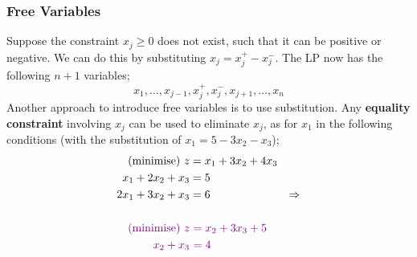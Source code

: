 \documentclass[a4paper, 12pt]{article}
\newcommand{\violet}[1]{\textcolor{violet}{#1}}
\begin{document}
            \subsubsection*{Free Variables}
                Suppose the constraint $x_j \geq 0$ does not exist, such that it can be positive or negative.
                We can do this by substituting $x_j = x_j^+ - x_j^-$.
                The LP now has the following $n + 1$ variables;
                $$x_1, \dots, x_{j - 1}, x_j^+, x_j^-, x_{j + 1}, \dots, x_n$$
                Another approach to introduce free variables is to use substitution.
                Any \textbf{equality constraint} involving $x_j$ can be used to eliminate $x_j$, as for $x_1$ in the following conditions (with the substitution of $x_1 = 5 - 3x_2 - x_3$);
                \begin{align*}
                    \text{(minimise) } z & = x_1 + 3x_2 + 4x_3 \\
                    x_1 + 2x_2 + x_3 & = 5 \\
                    2x_1 + 3x_2 + x_3 & = 6 & \Rightarrow \\ \\
                    \violet{\text{(minimise) } z} &\ \violet{= x_2 + 3x_3 + 5} \\
                    \violet{x_2 + x_3} &\ \violet{= 4}
                \end{align*}
\end{document}
